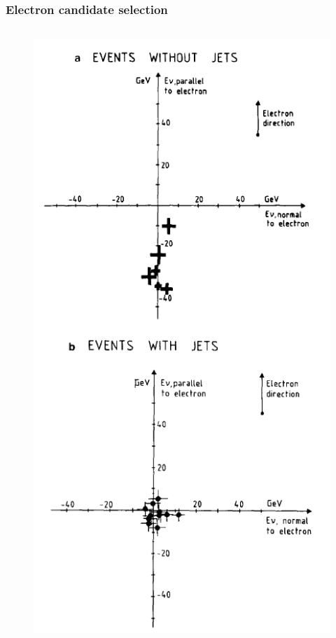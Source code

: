 \documentclass[xcolor=table]{beamer}
\begin{document}
\begin{frame}
\frametitle{Electron candidate selection}
\fontsize{12pt}{12}\selectfont

\begin{columns}

\begin{figure}[h]
\centering
\includegraphics[height=0.85\textheight]{images/electron-selection-energy.png}
\end{figure}




\end{columns}
\end{frame}
\end{document}
